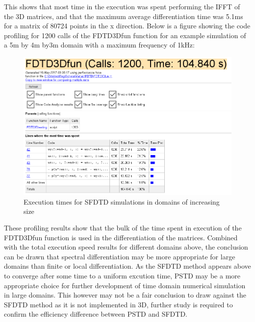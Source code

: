 This shows that most time in the execution was spent performing the IFFT of the 3D matrices, and that the maximum average differentiation time was 5.1ms for a matrix of 80724 points in the x direction. Below is a figure showing the code profiling for 1200 calls of the FDTD3Dfun function for an example simulation of a 5m by 4m by3m domain with a maximum frequency of 1kHz:\\
\begin{figure}[H]
\centering
  \includegraphics[width=\textwidth]{./graphics/fdtdfunctioncodeprofile.png}
  \caption{Execution times for SFDTD simulations in domains of increasing size}
\end{figure}

These profiling results show that the bulk of the time spent in execution of the FDTD3Dfun function is used in the differentiation of the matrices. Combined with the total execution speed results for different domains above, the conclusion can be drawn that spectral differentiation may be more appropriate for large domains than finite or local differentiation. As the SFDTD method appears above to converge after some time to a uniform excution time, PSTD may be a more appropriate choice for further development of time domain numerical simulation in large domains. This however may not be a fair conclusion to draw against the SFDTD method as it is not implemented in 3D, further study is required to confirm the efficiency difference between PSTD and SFDTD.